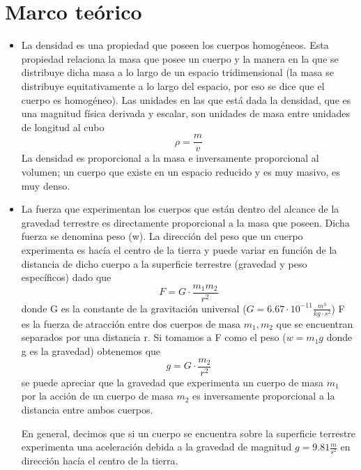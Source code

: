 \documentclass{article}
\begin{document}
\section*{Marco teórico}
\begin{itemize}
\item La densidad es una propiedad que poseen los cuerpos homogéneos. Esta propiedad relaciona la masa que posee un cuerpo y la manera en la que se distribuye dicha masa a lo largo de un espacio tridimensional (la masa se distribuye equitativamente a lo largo del espacio, por eso se dice que el cuerpo es homogéneo). Las unidades en las que está dada la densidad, que es una magnitud física derivada y escalar, son unidades de masa entre unidades de longitud al cubo 
\begin{equation}
    \rho = \frac{m}{v}
\end{equation}
La densidad es proporcional a la masa e inversamente proporcional al volumen; un cuerpo que existe en un espacio reducido y es muy masivo, es muy denso.
\item La fuerza que experimentan los cuerpos que están dentro del alcance de la gravedad terrestre es directamente proporcional a la masa que poseen. Dicha fuerza se denomina peso (w). La dirección del peso que un cuerpo experimenta es hacía el centro de la tierra y puede variar en función de la distancia de dicho cuerpo a la superficie terrestre (gravedad y peso específicos) dado que 
\begin{equation}
    F = G \cdot \frac{ m_{1}m_{2}}{r^2}
\end{equation}
donde G es la constante de la gravitación universal ($G = 6.67 \cdot 10^{-11}\frac{m^{3}}{kg\cdot s^2}$) F es la fuerza de atracción entre dos cuerpos de masa $m_{1}, m_{2}$ que se encuentran separados por una distancia r. Si tomamos a F como el peso ($w = m_{1}g$ donde g es la gravedad) obtenemos que
\begin{equation}
    g = G \cdot \frac{m_{2}}{r^2}
\end{equation}
se puede apreciar que la gravedad que experimenta un cuerpo de masa $m_{1}$ por la acción de un cuerpo de masa $m_{2}$ es inversamente proporcional a la distancia entre ambos cuerpos. \par
En general, decimos que si un cuerpo se encuentra sobre la superficie terrestre experimenta una aceleración debida a la gravedad de magnitud $g = 9.81 \frac{m}{s^2}$ en dirección hacía el centro de la tierra.
\end{itemize}
\end{document}
